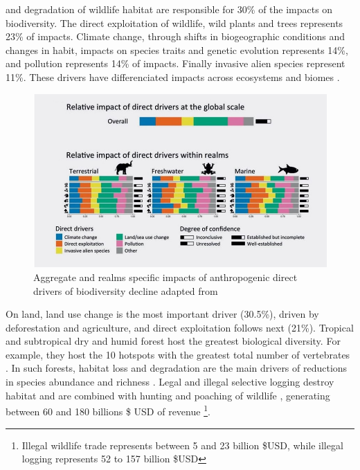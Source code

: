 %
and degradation of wildlife habitat are responsible for 30\% of the impacts on biodiversity. The direct exploitation of wildlife, wild plants and trees represents 23\% of impacts. Climate change, through shifts in biogeographic conditions and changes in habit, impacts on species traits and genetic evolution represents 14\%, and pollution represents 14\% of impacts. Finally invasive alien species represent 11\%. These drivers have differenciated impacts across ecosystems and biomes \citep{ipbes_2022_6417333}. 

\begin{figure}[h]
	\centering
	\includegraphics[width = .95 \textwidth]{figures/intro/intro_impactsfin.jpg}
	\caption{Aggregate and realms specific impacts of anthropogenic direct drivers of biodiversity decline adapted from \citep{ipbes_2022_6417333}}
	\label{fig:intro_impacts}
\end{figure}

On land, land use change is the most important driver (30.5\%), driven by deforestation and agriculture, and direct exploitation follows next (21\%). Tropical and subtropical dry and humid forest host the greatest biological diversity. For example, they host the 10 hotspots with the greatest total number of vertebrates \citep{mittermeier_global_2011}. In such forests, habitat loss and degradation are the main drivers of reductions in species abundance and richness \citep{newbold_global_2014}. Legal and illegal selective logging destroy habitat \citep{hoare2022establishing,  bousfield_2023_large} and are combined with hunting and poaching of wildlife \citep{gallego_2020_combined}, generating between 60 and 180 billions  \$ USD of revenue \citep{gfi_2017}\footnote{Illegal wildlife trade represents between 5 and 23 billion \$USD, while illegal logging represents 52 to 157 billion \$USD}. 

